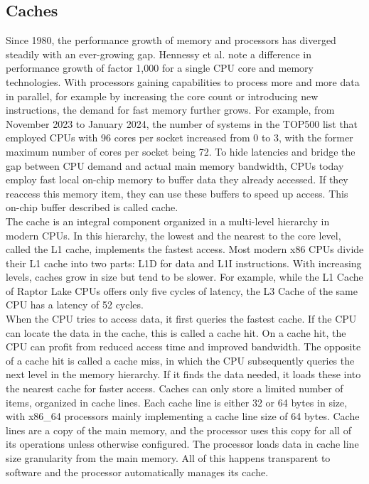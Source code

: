 \subsection{Caches}
\label{sec:state:technical:caches}
Since 1980, the performance growth of memory and processors has diverged
steadily with an ever-growing gap. Hennessy et al. note a difference in
performance growth of factor 1,000 for a single CPU core and memory
technologies.\cite{hennessy2011computer} With processors gaining capabilities to
process more and more data in parallel, for example by increasing the core count
or introducing new instructions, the demand for fast memory further grows. For
example, from November 2023 to January 2024, the number of systems in the TOP500
list that employed CPUs with 96 cores per socket increased from 0 to 3, with the
former maximum number of cores per socket being 72.\cite{top500} To hide
latencies and bridge the gap between CPU demand and actual main memory
bandwidth, CPUs today employ fast local on-chip memory to buffer data they
already accessed. If they reaccess this memory item, they can use these buffers
to speed up access. This on-chip buffer described is called cache.\\

The cache is an integral component organized in a multi-level hierarchy in
modern CPUs. In this hierarchy, the lowest and the nearest to the core level,
called the L1 cache, implements the fastest access. Most modern x86 CPUs divide
their L1 cache into two parts: L1D for data and L1I instructions. With
increasing levels, caches grow in size but tend to be slower. For example, while
the L1 Cache of Raptor Lake CPUs offers only five cycles of latency, the L3 Cache of
the same CPU has a latency of 52 cycles.\\

When the CPU tries to access data, it first queries the fastest cache. If the
CPU can locate the data in the cache, this is called a cache hit. On a cache
hit, the CPU can profit from reduced access time and improved bandwidth. The
opposite of a cache hit is called a cache miss, in which the CPU subsequently
queries the next level in the memory hierarchy. If it finds the data needed, it
loads these into the nearest cache for faster access. Caches can only store a
limited number of items, organized in cache lines. Each cache line is either 32
or 64 bytes in size, with x86\_64 processors mainly implementing a cache line
size of 64 bytes. Cache lines are a copy of the main memory, and the processor
uses this copy for all of its operations unless otherwise configured. The
processor loads data in cache line size granularity from the main memory. All of
this happens transparent to software and the processor automatically manages its
cache. \\


